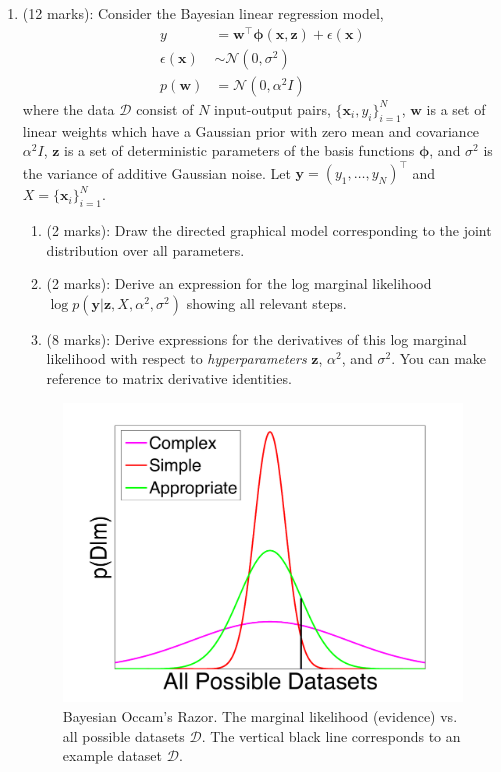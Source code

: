 \documentclass[11pt]{article}
\newcommand{\mbf}[1]{{\boldsymbol{\mathbf{#1}}}}
\renewcommand{\bm}{\mbf}
\begin{document}
\begin{enumerate}
\item (12 marks): Consider the Bayesian linear regression model, 
\begin{align}
y &= \bm{w}^{\top} \bm{\phi}(\bm{x},\bm{z}) + \epsilon(\bm{x})   \\
\epsilon(\bm{x}) &\sim \mathcal{N}(0,\sigma^2) \\
p(\bm{w}) &= \mathcal{N}(0,\alpha^2 I) 
\end{align}
where the data $\mathcal{D}$ consist of $N$ input-output pairs, $\{\bm{x}_i, y_i\}_{i=1}^{N}$, $\bm{w}$ is a set of linear weights which have a Gaussian prior with zero mean and covariance $\alpha^2 I$, $\bm{z}$ is a set of deterministic parameters of the basis functions $\bm{\phi}$, and $\sigma^2$ is the variance of additive Gaussian noise.  Let 
$\bm{y} = (y_1,\dots,y_N)^{\top}$ and $X = \{\bm{x}_i\}_{i=1}^{N}$.  
\begin{enumerate}[label=(\alph*)]
 \item (2 marks): Draw the directed graphical model corresponding to the joint distribution over all parameters. 
\item (2 marks): Derive an expression for the log marginal likelihood $\log p(\bm{y} | \bm{z}, X, \alpha^2, \sigma^2)$ showing all relevant steps. 
\item (8 marks): Derive expressions for the derivatives of this log marginal likelihood with respect to \emph{hyperparameters} $\bm{z}$, $\alpha^2$, and $\sigma^2$.  You can make reference to matrix derivative identities.
\end{enumerate}



\begin{figure}[t!]
\centering
\includegraphics[scale=0.45]{./figs/occambestnew}
\caption{Bayesian Occam's Razor.  The marginal
likelihood (evidence) vs. all possible datasets $\mathcal{D}$.  The vertical black line corresponds to an 
example dataset $\mathcal{D}$.}
\label{fig: occam}
\end{figure}


\end{enumerate}
\end{document}
